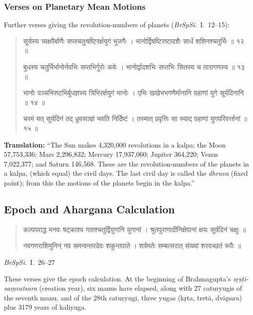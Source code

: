 \documentclass[11pt,a4paper]{article}
\newcommand{\dev}[1]{{\devanagarifont #1}}
\newenvironment{sanskritverse}{%
  \begin{quote}
  \devanagarifont
  \small
  \color{titlecolor}
}{\end{quote}}
\theoremstyle{definition}
\begin{document}
\subsubsection{Verses on Planetary Mean Motions}

Further verses giving the revolution-numbers of planets (\textit{BrSpSi}.\ I.\ 12--15):

\begin{sanskritverse}
\dev{सूर्यस्य त्र्यक्षरैर्बाणैः सप्तचतुःषष्टिरर्क्षयुगं भुजगैः ।}
\dev{भानोर्द्विषष्टिरष्टादशैः सार्धं शशिनश्चतुर्भिः ॥ १२ ॥}

\dev{बुधस्य चतुर्भिर्भानोर्नवभिः सप्तभिर्गुरोः कवेः ।}
\dev{भानोर्द्वादशभिः सप्तभिः सितस्य च तारागणस्य ॥ १३ ॥}

\dev{भानोः पञ्चभिरष्टभिर्बुधज्ञस्य त्रिभिरर्क्षयुगं भानोः ।}
\dev{एभिः खखेभभगणैर्मानानि ग्रहाणां युगे सूर्यदिनानि ॥ १४ ॥}

\dev{चरमं यत् सूर्यदिनं तद् ध्रुवसञ्ज्ञं भवति निर्दिष्टं ।}
\dev{तस्मात् प्रवृत्तिः सा स्याद् ग्रहाणां युगपरिवर्त्तानां ॥ १५ ॥}
\end{sanskritverse}

\textbf{Translation:} ``The Sun makes 4,320,000 revolutions in a kalpa; the Moon 57,753,336; Mars 2,296,832; Mercury 17,937,060; Jupiter 364,220; Venus 7,022,377; and Saturn 146,568. These are the revolution-numbers of the planets in a kalpa, (which equal) the civil days. The last civil day is called the \textit{dhruva} (fixed point); from this the motions of the planets begin in the kalpa.''

\vspace{0.3cm}

\subsection{Epoch and Ahargana Calculation}

\begin{sanskritverse}
\dev{कल्पपराद्ध मनवः षट्काश्य गताश्चतुर्द्वियुगानि युगानां ।}
\dev{श्रुतपुराणादीनिक्षेपानां क्षयः सूर्यदिनं चक्षुः ॥}

\dev{नवगणराशिमुनिन् नव समन्वन्तरदेवः शकुन्तपाते ।}
\dev{शर्वमतेः सम्बत्सरात् संख्यां शरवच्छतं रूपैः ॥}
\end{sanskritverse}

\textit{BrSpSi}.\ I.\ 26--27

These verses give the epoch calculation. At the beginning of Brahmagupta's \textit{s\d{r}\d{s}\d{t}i-sa\d{m}vatsara} (creation year), six manus have elapsed, along with 27 caturyugis of the seventh manu, and of the 28th caturyugi, three yugas (k\d{r}ta, tret\=a, dv\=apara) plus 3179 years of kaliyuga.
\end{document}
